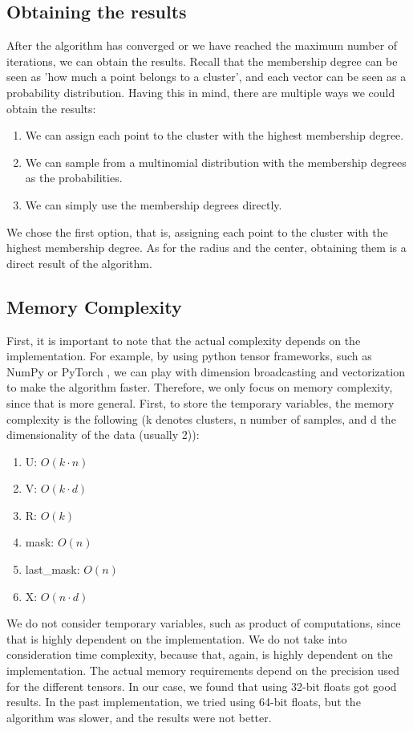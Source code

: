 \documentclass[conference]{IEEEtran}
\begin{document}
\subsection{Obtaining the results}
After the algorithm has converged or we have reached the maximum number of iterations, we can obtain the results.
Recall that the membership degree can be seen as 'how much a point belongs to a cluster', and each vector can be seen as a probability distribution.
Having this in mind, there are multiple ways we could obtain the results:
\begin{enumerate}
    \item We can assign each point to the cluster with the highest membership degree.
    \item We can sample from a multinomial distribution with the membership degrees as the probabilities.
    \item We can simply use the membership degrees directly.
\end{enumerate}
We chose the first option, that is, assigning each point to the cluster with the highest membership degree.
As for the radius and the center, obtaining them is a direct result of the algorithm.

\subsection{Memory Complexity}
First, it is important to note that the actual complexity depends on the implementation. For example, by using python tensor frameworks,
such as NumPy \cite{harris2020array} or PyTorch \cite{paszke2019pytorch}, we can play with dimension broadcasting and vectorization to make the algorithm faster.
Therefore, we only focus on memory complexity, since that is more general.
First, to store the temporary variables, the memory complexity is the following (k denotes clusters, n number of samples, and d the dimensionality of the data (usually 2)):
\begin{enumerate}
    \item U: $O(k \cdot n)$
    \item V: $O(k \cdot d)$
    \item R: $O(k)$
    \item mask: $O(n)$
    \item last\_mask: $O(n)$
    \item X: $O(n \cdot d)$
\end{enumerate}
We do not consider temporary variables, such as product of computations, since that is highly dependent on the implementation.
We do not take into consideration time complexity, because that, again, is highly dependent on the implementation.
The actual memory requirements depend on the precision used for the different tensors. In our case, we found that using 32-bit floats got good results.
In the past implementation, we tried using 64-bit floats, but the algorithm was slower, and the results were not better.
\end{document}
